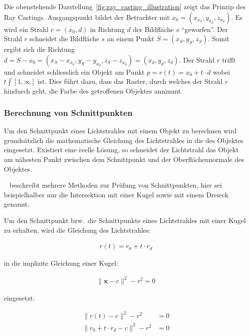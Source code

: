 Die obenstehende Darstellung~\ref{fig:ray_casting_illustration} zeigt
das Prinzip des Ray Castings. Ausgangspunkt bildet der Betrachter mit
$x_{0} = (x_{x_{0}}, y_{x_{0}}, z_{x_{0}})$. Es wird ein Strahl $r = (x_{0}, d)$
in Richtung $d$ der Bildfläche $s$ ``geworfen''. Der Strahl $r$
schneidet die Bildfläche $s$ an einem Punkt $S = (x_{S}, y_{S}, z_{S})$.
Somit ergibt sich die Richtung $d = S - x_{0} = (x_{S} - x_{x_{0}},
y_{S} - y_{x_{0}}, z_{S} - z_{x_{0}}) = (x_{d}, y_{d}, z_{d})$. Der
Strahl $r$ trifft und schneidet schliesslich ein Objekt am Punkt $p =
r(t) = x_{0} + t \cdot d$ wobei $t \int [1, \infty]$ ist. Dies führt dazu, dass das
Raster, durch welches der Strahl $r$ hindurch geht, die Farbe des
getroffenen Objektes annimmt.

\subsubsection{Berechnung von Schnittpunkten}
\label{ssubsec:ray_casting_intersections}

Um den Schnittpunkt eines Lichtstrahles mit einem Objekt zu berechnen
wird grundsätzlich die mathematische Gleichung des Lichtstrahles in die
des Objektes eingesetzt. Existiert eine reelle Lösung, so schneidet der
Lichtstrahl das Objekt am nähesten Punkt zwischen dem Schnittpunkt und
der Oberflächennormale des Objektes.

~\citeauthor{glassner_introduction_1989} beschreibt mehrere Methoden zur
Prüfung von Schnittpunkten, hier sei beispielhalber nur die Intersektion
mit einer Kugel sowie mit einem Dreieck genannt.

Um den Schnittpunkt bzw.\ die Schnittpunkte eines Lichtstrahles mit
einer Kugel zu erhalten, wird die Gleichung des Lichtstrahles:

\begin{gather}
    r(t) = r_{0} + t \cdot r_{d}
\end{gather}

in die implizite Gleichung einer Kugel:

\begin{gather}
    \|\bm{x} - c\|^{2} - r^{2} = 0
\end{gather}

eingesetzt:

\begin{align}
    \|r(t) - c\|^{2} - r^{2} &= 0 \\
    \|r_{0} + t \cdot r_{d} - c\|^{2} - r^{2} &= 0
\end{align}

